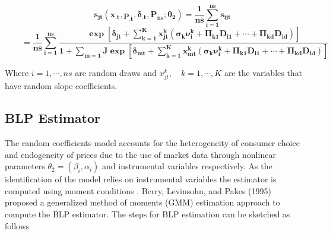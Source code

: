 \documentclass[a4paper,11pt]{article}
\begin{document}
    \begin{equation*}
        \qquad \mathbf{s_{jt}(x_{.t},p_{.t},\delta_{.t},P_{ns};\theta_{2}) = \dfrac{1}{ns}\sum_{i=1}^{ns}s_{ijt}}
    \end{equation*}
    \begin{equation*}
        \qquad \mathbf{= \dfrac{1}{ns}\sum_{i=1}^{ns}\dfrac{\exp\left[\delta_{jt} + \sum_{k=1}^{K} x_{jt}^{k}\left(\sigma_{k}\nu_{i}^{k} + \Pi_{k1}D_{i1} + \cdots + \Pi_{kd}D_{id}\right)\right]}
        {1 + \sum_{m = 1}{J} \exp\left[\delta_{mt} + \sum_{k=1}^{K} x_{mt}^{k}\left(\sigma_{k}\nu_{i}^{k} + \Pi_{k1}D_{i1} + \cdots + \Pi_{kd}D_{id}\right)\right]}}
    \end{equation*}

    Where $i = 1, \cdots, ns$ are random draws and $x_{jt}^{k}, \quad k = 1, \cdots, K$ are the variables that have random slope coefficients.

    
\subsection{BLP Estimator}
\label{subsec: Estimator}

    The random coefficients model accounts for the heterogeneity of consumer choice and endogeneity of prices due to the use of market data through nonlinear parameters $\theta_{2} = (\beta_{i},\alpha_{i})$ and instrumental variables respectively. As the identification of the model relies on instrumental variables the estimator is computed using moment conditions \cite{BerryandHaile}. Berry, Levinsohn, and Pakes (1995) proposed a generalized method of moments (GMM) estimation approach to compute the BLP estimator. The steps for BLP estimation can be sketched as follows\\
\end{document}
